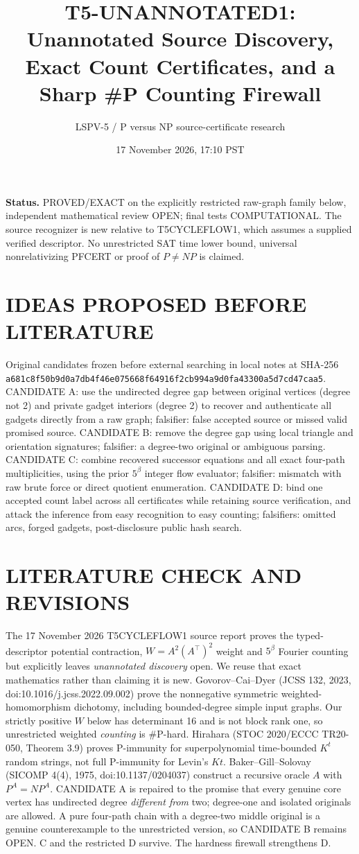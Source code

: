 \documentclass[11pt]{article}
\title{T5-UNANNOTATED1: Unannotated Source Discovery, Exact Count Certificates, and a Sharp \#P Counting Firewall}
\author{LSPV-5 / P versus NP source-certificate research}
\date{17 November 2026, 17:10 PST}
\begin{document}
\maketitle
\noindent\textbf{Status.} PROVED/EXACT on the explicitly restricted raw-graph family below, independent mathematical review OPEN; final tests COMPUTATIONAL. The source recognizer is new relative to T5CYCLEFLOW1, which assumes a supplied verified descriptor. No unrestricted SAT time lower bound, universal nonrelativizing PFCERT or proof of $P\ne NP$ is claimed.

\section{IDEAS PROPOSED BEFORE LITERATURE}
Original candidates frozen before external searching in local notes at SHA-256
\texttt{a681c8f50b9d0a7db4f46e075668f64916f2cb994a9d0fa43300a5d7cd47caa5}.
CANDIDATE A: use the undirected degree gap between original vertices (degree not 2) and private gadget interiors (degree 2) to recover and authenticate all gadgets directly from a raw graph; falsifier: false accepted source or missed valid promised source.
CANDIDATE B: remove the degree gap using local triangle and orientation signatures; falsifier: a degree-two original or ambiguous parsing.
CANDIDATE C: combine recovered successor equations and all exact four-path multiplicities, using the prior $5^\beta$ integer flow evaluator; falsifier: mismatch with raw brute force or direct quotient enumeration.
CANDIDATE D: bind one accepted count label across all certificates while retaining source verification, and attack the inference from easy recognition to easy counting; falsifiers: omitted arcs, forged gadgets, post-disclosure public hash search.

\section{LITERATURE CHECK AND REVISIONS}
The 17 November 2026 T5CYCLEFLOW1 source report proves the typed-descriptor potential contraction, $W=A^2(A^\top)^2$ weight and $5^\beta$ Fourier counting but explicitly leaves \emph{unannotated discovery} open. We reuse that exact mathematics rather than claiming it is new.
Govorov--Cai--Dyer (JCSS 132, 2023, doi:10.1016/j.jcss.2022.09.002) prove the nonnegative symmetric weighted-homomorphism dichotomy, including bounded-degree simple input graphs. Our strictly positive $W$ below has determinant 16 and is not block rank one, so unrestricted weighted \emph{counting} is \#P-hard.
Hirahara (STOC 2020/ECCC TR20-050, Theorem 3.9) proves P-immunity for superpolynomial time-bounded $K^t$ random strings, not full P-immunity for Levin's $Kt$.
Baker--Gill--Solovay (SICOMP 4(4), 1975, doi:10.1137/0204037) construct a recursive oracle $A$ with $P^A=NP^A$.
CANDIDATE A is repaired to the promise that every genuine core vertex has undirected degree \emph{different from} two; degree-one and isolated originals are allowed. A pure four-path chain with a degree-two middle original is a genuine counterexample to the unrestricted version, so CANDIDATE B remains OPEN. C and the restricted D survive. The hardness firewall strengthens D.
\end{document}
